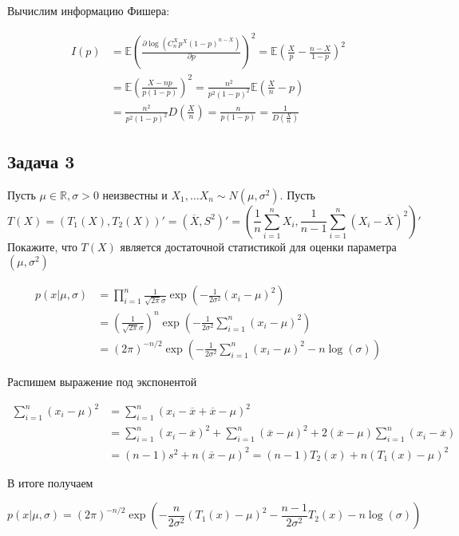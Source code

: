 \documentclass[
paper = a4,
fontsize = 12pt,
headinclude = true,
open = right,
twoside = true,
BCOR = 10mm,
toc = listofnumbered,
toc = bibnumbered,
numbers = noendperiod
]{scrreprt}
\begin{document}
	Вычислим информацию Фишера:
	
	\begin{align*}
		I(p) 
		&= \mathbb{E}\left(\frac{\partial\log(C_{n}^{X}p^{X}(1 - p)^{n - X})}{\partial p}\right)^{2} 
		= \mathbb{E}\left(\frac{X}{p} - \frac{n - X}{1 - p}\right)^{2}\\
		&=  \mathbb{E}\left(\frac{X - np}{p(1 - p)}\right)^{2}
		= \frac{n^{2}}{p^{2}(1 - p)^{2}}\mathbb{E}\left(\frac{X}{n} - p\right) \\
		&= \frac{n^{2}}{p^{2}(1 - p)^{2}}D\left(\frac{X}{n}\right)
		= \frac{n}{p(1 - p)} = \frac{1}{D\left(\frac{X}{n}\right)}
	\end{align*}

	\clearpage
	
	\subsection*{Задача 3}
	
	Пусть $\mu\in\mathbb{R}, \sigma > 0$ неизвестны и $X_{1}, \dots X_{n}\sim N(\mu, \sigma^{2})$. Пусть 
	$$T(X) = (T_{1}(X), T_{2}(X))' = (\overline{X}, S^{2})' = \left(\frac{1}{n}\sum_{i = 1}^{n}X_{i}, \frac{1}{n - 1}\sum_{i = 1}^{n}(X_{i} - \overline{X})^{2}\right)'$$
	Покажите, что $T(X)$ является достаточной статистикой для оценки параметра $(\mu, \sigma^{2})$
	
	\begin{align*}
		p(x|\mu, \sigma) 
		&= \prod_{i = 1}^{n}\frac{1}{\sqrt{2\pi}\sigma}\exp\left(-\frac{1}{2\sigma^{2}}(x_{i} - \mu)^{2}\right) \\
		&= \left(\frac{1}{\sqrt{2\pi}\sigma}\right)^{n}\exp\left(-\frac{1}{2\sigma^{2}}\sum_{i = 1}^{n}(x_{i} - \mu)^{2}\right) \\
		&= (2\pi)^{-n/2}\exp\left(-\frac{1}{2\sigma^{2}}\sum_{i = 1}^{n}(x_{i} -\mu)^{2} -n\log(\sigma)\right)
	\end{align*}

	Распишем выражение под экспонентой
	
	\begin{align*}
		\sum_{i = 1}^{n}(x_{i} - \mu)^{2} 
		&= \sum_{i = 1}^{n}(x_{i} - \overline{x} + \overline{x} - \mu)^{2}\\
		&= \sum_{i = 1}^{n}(x_{i} - \overline{x})^{2} + \sum_{i = 1}^{n}(\overline{x} - \mu)^{2} + 2(\overline{x} - \mu)\sum_{i = 1}^{n}(x_{i} - \overline{x}) \\
		&= (n - 1)s^{2} + n(\overline{x} - \mu)^{2}
		= (n - 1)T_{2}(x) + n(T_{1}(x) - \mu)^{2}
	\end{align*}


	В итоге получаем
	
	$$p(x|\mu, \sigma) = (2\pi)^{-n/2}\exp\left(-\frac{n}{2\sigma^{2}}(T_{1}(x) - \mu)^{2} - \frac{n - 1}{2\sigma^{2}}T_{2}(x) - n\log(\sigma)\right)$$
	
	
\end{document}

